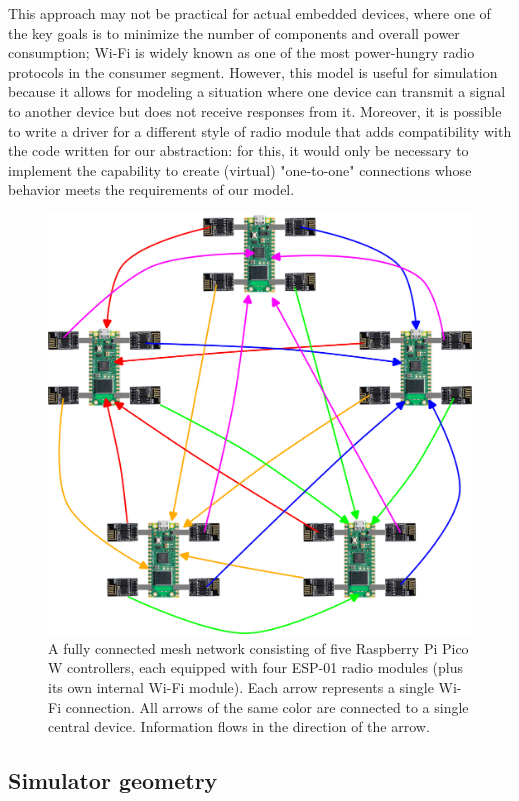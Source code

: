 \documentclass[%
]{article}
\begin{document}
This approach may not be practical for actual embedded devices,
where one of the key goals is to minimize the number of components and overall power consumption;
Wi-Fi is widely known as one of the most power-hungry radio protocols in the consumer segment.
However, this model is useful for simulation because it allows for modeling a situation
where one device can transmit a signal to another device but does not receive responses from it.
Moreover, it is possible to write a driver for a different style of radio module that adds compatibility with the code written for our abstraction:
for this, it would only be necessary to implement the capability to create (virtual) "one-to-one" connections whose behavior meets the requirements of our model.

\begin{figure}
  \centering
  \includegraphics[width=0.8\linewidth]{connections}
  \caption{A fully connected mesh network consisting of five Raspberry Pi Pico W controllers,
  each equipped with four ESP-01 radio modules (plus its own internal Wi-Fi module).
  Each arrow represents a single Wi-Fi connection.
  All arrows of the same color are connected to a single central device. Information flows in the direction of the arrow.} 
  \label{fig:connections}
\end{figure}


\subsection{Simulator geometry}
\end{document}
